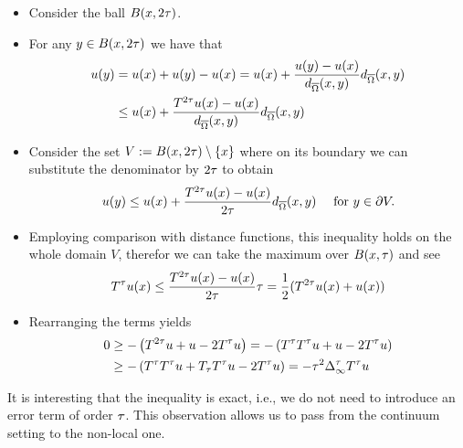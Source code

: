 \begin{itemize}
\item Consider the ball $B(x,2\tau)$.
\item For any $y\in B(x,2\tau)$ we have that
%
\begin{align*}
u(y) &= u(x) + u(y) - u(x) = 
u(x) + \frac{u(y) - u(x)}{d_{\overline{\Omega}}(x,y)}d_{\overline{\Omega}}(x,y)\\
&\leq 
u(x) + \frac{T^{2\tau} u(x) - u(x)}{d_{\overline{\Omega}}(x,y)}d_{\overline{\Omega}}(x,y)
\end{align*}
%
\item Consider the set $V:=B(x,2\tau)\setminus\{x\}$ where on its boundary we can substitute the denominator by $2\tau$ to obtain
%
\begin{align*}
u(y) \leq 
u(x) + \frac{T^{2\tau} u(x) - u(x)}{2\tau}d_{\overline{\Omega}}(x,y) \quad \text{ for } y\in\partial V.
\end{align*}
%
\item Employing comparison with distance functions, this inequality holds on the whole domain $V$, therefor we can take the maximum over $B(x,\tau)$ and see
%
\begin{align*}
T^\tau u(x) \leq \frac{T^{2\tau} u(x) - u(x)}{2\tau} \tau = \frac{1}{2}(T^{2\tau} u(x) + u(x))
\end{align*}
%
\item Rearranging the terms yields
%
\begin{align*}
0&\geq -\left(T^{2\tau} u + u - 2T^\tau u\right) = -\left(T^{\tau}T^{\tau} u + u - 2T^\tau u\right)\\
&\geq 
-\left(T^{\tau}T^{\tau} u + T_\tau T^\tau u - 2T^\tau u\right) = -\tau^2 \Delta^\tau_\infty T^\tau u
\end{align*}
\end{itemize}
%
It is interesting that the inequality is exact, i.e., we do not need to introduce an error term of order $\tau$. This observation allows us to pass from the continuum setting to the non-local one.
%
%
